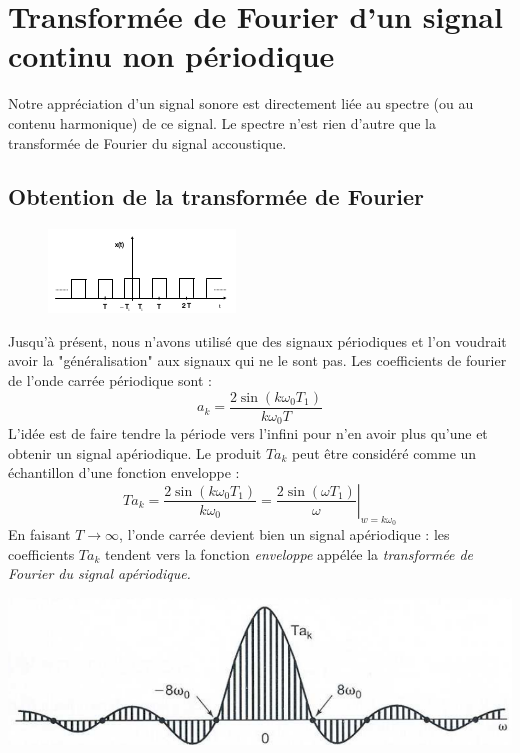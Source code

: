 



\section{Transformée de Fourier d'un signal continu non périodique}
Notre appréciation d’un signal sonore est directement liée au spectre 
(ou au contenu harmonique) de ce signal. Le spectre n'est rien d'autre
que la transformée de Fourier du signal accoustique.

	\subsection{Obtention de la transformée de Fourier}
	\begin{figure}
	\includegraphics[scale=0.5]{ch10/image1.png}
	\end{figure}
	Jusqu'à présent, nous n'avons utilisé que des signaux périodiques 
	et l'on voudrait avoir la "généralisation" aux signaux qui ne le
	sont pas. Les coefficients de fourier de l'onde carrée périodique
	sont :
	\begin{equation}
	a_k = \frac{2\sin(k\omega_0T_1)}{k\omega_0T}
	\end{equation}
	L'idée est de faire tendre la période vers l'infini pour n'en 
	avoir plus qu'une et obtenir un signal apériodique. Le produit
	$Ta_k$ peut être considéré comme un échantillon d'une fonction 
	enveloppe : 
	\begin{equation}
	Ta_k = \frac{2\sin(k\omega_0T_1)}{k\omega_0} = \left.\frac{2\sin
	(\omega T_1)}{\omega}\right|_{w=k\omega_0}
	\end{equation}
	En faisant $T\rightarrow\infty$, l'onde carrée devient bien un
	signal apériodique : les coefficients $Ta_k$ tendent vers la 
	fonction \textit{enveloppe}  appélée la \textit{transformée de
	Fourier du signal apériodique.}
	\begin{center}
	\includegraphics[scale=0.2]{ch10/image2.png}
	\end{center}

